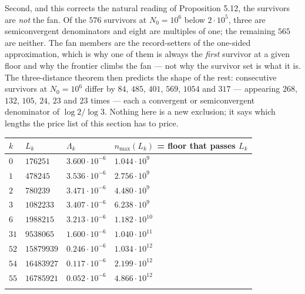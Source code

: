 \documentclass[12pt]{article}
\begin{document}
Second, and this corrects the natural reading of Proposition 5.12, the
survivors are \emph{not} the fan. Of the \(576\) survivors at
\(N_0=10^6\) below \(2\cdot10^5\), three are semiconvergent denominators
and eight are multiples of one; the remaining \(565\) are neither. The
fan members are the record-setters of the one-sided approximation, which
is why one of them is always the \emph{first} survivor at a given floor
and why the frontier climbs the fan --- not why the survivor set is what
it is. The three-distance theorem then predicts the shape of the rest:
consecutive survivors at \(N_0=10^6\) differ by \(84\), \(485\),
\(401\), \(569\), \(1054\) and \(317\) --- appearing \(268\), \(132\),
\(105\), \(24\), \(23\) and \(23\) times --- each a convergent or
semiconvergent denominator of \(\log 2/\log 3\). Nothing here is a new
exclusion; it says which lengths the price list of this section has to
price.

\begingroup\small

\begin{longtable}[]{@{}
  >{\raggedright\arraybackslash}p{}
  >{\raggedright\arraybackslash}p{}
  >{\raggedright\arraybackslash}p{}
  >{\raggedright\arraybackslash}p{}@{}}
\toprule\noalign{}
\begin{minipage}[b]{\linewidth}\raggedright
\(k\)
\end{minipage} & \begin{minipage}[b]{\linewidth}\raggedright
\(L_k\)
\end{minipage} & \begin{minipage}[b]{\linewidth}\raggedright
\(\Lambda_k\)
\end{minipage} & \begin{minipage}[b]{\linewidth}\raggedright
\(n_{\max}(L_k)\) = floor that passes \(L_k\)
\end{minipage} \\
\midrule\noalign{}
\endhead
\bottomrule\noalign{}
\endfoot
\bottomrule\noalign{}
\endlastfoot
\(0\) & \(176251\) & \(3.600\cdot10^{-6}\) & \(1.044\cdot10^{9}\) \\
\(1\) & \(478245\) & \(3.536\cdot10^{-6}\) & \(2.756\cdot10^{9}\) \\
\(2\) & \(780239\) & \(3.471\cdot10^{-6}\) & \(4.480\cdot10^{9}\) \\
\(3\) & \(1082233\) & \(3.407\cdot10^{-6}\) & \(6.238\cdot10^{9}\) \\
\(6\) & \(1988215\) & \(3.213\cdot10^{-6}\) & \(1.182\cdot10^{10}\) \\
\(31\) & \(9538065\) & \(1.600\cdot10^{-6}\) & \(1.040\cdot10^{11}\) \\
\(52\) & \(15879939\) & \(0.246\cdot10^{-6}\) & \(1.034\cdot10^{12}\) \\
\(54\) & \(16483927\) & \(0.117\cdot10^{-6}\) & \(2.199\cdot10^{12}\) \\
\(55\) & \(16785921\) & \(0.052\cdot10^{-6}\) & \(4.866\cdot10^{12}\) \\*
\end{longtable}
\end{document}
